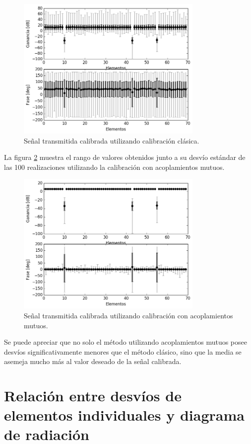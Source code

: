 \begin{figure}[H]
	\centering
	\includegraphics[width=9cm]{gfx/classicalMontecarlo.png}
	\caption{Señal transmitida calibrada utilizando calibración clásica.}
	\label{fig:classicalMontecarlo}
\end{figure}

La figura \ref{fig:mutualMontecarlo} muestra  el rango de valores obtenidos junto a su desvío estándar de las 100 
realizaciones utilizando la calibración con acoplamientos mutuos.

\begin{figure}[H]
	\centering
	\includegraphics[width=9cm]{gfx/mutualMontecarlo.png}
	\caption{Señal transmitida calibrada utilizando calibración con acoplamientos mutuos.}
	\label{fig:mutualMontecarlo}
\end{figure}

Se puede apreciar que no solo el método utilizando acoplamientos mutuos posee desvíos significativamente menores que el 
método clásico, sino que la media se asemeja mucho más al valor deseado de la señal calibrada.


\section{Relación entre desvíos de elementos individuales y diagrama de radiación}
\label{sc:relationDispersionRadiationPattern}

